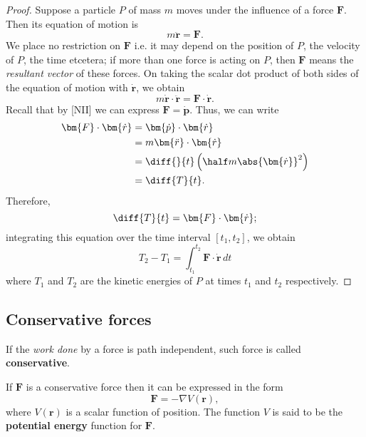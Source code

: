 \documentclass[12pt, a4paper]{article}
\begin{document}
\begin{proof}
    Suppose a particle \(P\) of mass \(m\) moves under the influence of a force \(\bm{F}\). Then its equation of motion is 
    \[m\bm{\ddot{r}}=\bm{F}.\]
    We place no restriction on \(\bm{F}\) i.e. it may depend on the position of \(P\), the velocity of \(P\), the time etcetera; if more than one force is acting on \(P\), then \(\bm{F}\) means the \textit{resultant vector} of these forces. On taking the scalar dot product of both sides of the equation of motion with \(\bm{\dot{r}}\), we obtain
    \[m\bm{\dot{r}} \cdot \bm{\ddot{r}} = \bm{F} \cdot \bm{\dot{r}}.\]
    Recall that by [NII] we can express \(\bm{F}=\bm{\dot{p}}\). Thus, we can write
    \[\begin{aligned}
        \bm{F} \cdot \bm{\dot{r}} &= \bm{\dot{p}} \cdot \bm{\dot{r}} \\
        &= m\bm{\ddot{r}} \cdot \bm{\dot{r}} \\
        &= \diff{}{t} \left( \half m \abs{\bm{\dot{r}}}^2 \right) \\
        &= \diff{T}{t}.
    \end{aligned}\]
    Therefore, 
    \[\diff{T}{t} = \bm{F} \cdot \bm{\dot{r}};\]
    integrating this equation over the time interval \([t_1,t_2]\), we obtain 
    \[T_2-T_1 = \int_{t_1}^{t_2} \bm{F} \cdot \bm{\dot{r}} \, dt\]
    where \(T_1\) and \(T_2\) are the kinetic energies of \(P\) at times \(t_1\) and \(t_2\) respectively.
\end{proof}

\subsection{Conservative forces}

\begin{definition}
    If the \textit{work done} by a force is path independent, such force is called \textbf{conservative}.
\end{definition}

\begin{mdthm}
    If \(\bm{F}\) is a conservative force then it can be expressed in the form
    \[\bm{F}=-\nabla V(\bm{r}),\]
    where \(V(\bm{r})\) is a scalar function of position. The function \(V\) is said to be the \textbf{potential energy} function for \(\bm{F}\).
\end{mdthm}
\end{document}
